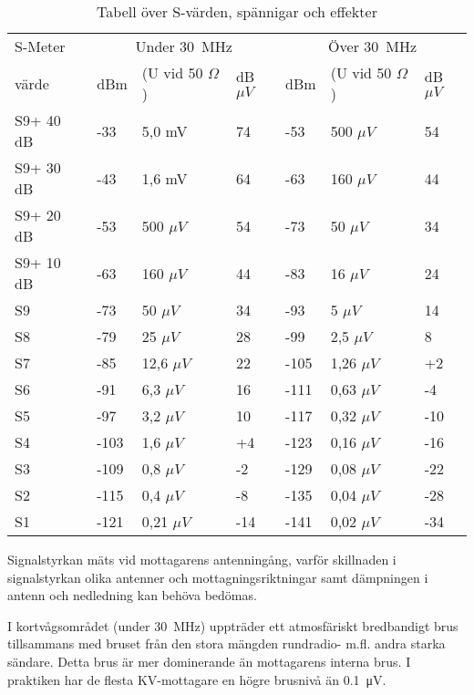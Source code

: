 \begin{table}[h!]
  \vspace{10ex}
	\centering
	\begin{tabular}{l|lll|lll}
    S-Meter  & \multicolumn{3}{c}{Under 30~MHz} & \multicolumn{3}{c}{Över 30~MHz} \\
    värde    & dBm & (U vid 50 \(\Omega\)) & dB\(\mu V\) & dBm & (U vid 50 \(\Omega\)) & dB\(\mu V\) \\
    \hline
    S9+ 40 dB & -33  & 5,0 mV  & 74  & -53  & 500 \(\mu V\) & 54  \\
    S9+ 30 dB & -43  & 1,6 mV  & 64  & -63  & 160 \(\mu V\) & 44  \\
    S9+ 20 dB & -53  & 500 \(\mu V\)  & 54  & -73  & 50 \(\mu V\) & 34  \\
    S9+ 10 dB & -63  & 160 \(\mu V\)  & 44  & -83  & 16 \(\mu V\) & 24  \\
    S9        & -73  & 50 \(\mu V\)   & 34  & -93  & 5 \(\mu V\) & 14  \\
    S8        & -79  & 25 \(\mu V\)   & 28  & -99  & 2,5 \(\mu V\) & 8   \\
    S7        & -85  & 12,6 \(\mu V\) & 22  & -105 & 1,26 \(\mu V\) & +2  \\
    S6        & -91  & 6,3 \(\mu V\)  & 16  & -111 & 0,63 \(\mu V\) & -4  \\
    S5        & -97  & 3,2 \(\mu V\)  & 10  & -117 & 0,32 \(\mu V\) & -10 \\
    S4        & -103 & 1,6 \(\mu V\)  & +4  & -123 & 0,16 \(\mu V\) & -16 \\
    S3        & -109 & 0,8 \(\mu V\)  & -2  & -129 & 0,08 \(\mu V\) & -22 \\
    S2        & -115 & 0,4 \(\mu V\)  & -8  & -135 & 0,04 \(\mu V\) & -28 \\
    S1        & -121 & 0,21 \(\mu V\) & -14 & -141 & 0,02 \(\mu V\) & -34 \\
  \end{tabular}
  \caption{Tabell över S-värden, spännigar och effekter}
\end{table}

\newpage

Signalstyrkan mäts vid mottagarens antenningång, varför skillnaden i
signalstyrkan olika antenner och mottagningsriktningar samt dämpningen
i antenn och nedledning kan behöva bedömas.

I kortvågsområdet (under \SI{30}{\mega\hertz}) uppträder ett atmosfäriskt
bredbandigt brus tillsammans med bruset från den stora mängden rundradio- m.fl.
andra starka sändare.
Detta brus är mer dominerande än mottagarens interna brus.
I praktiken har de flesta KV-mottagare en högre brusnivå än
\SI{0,1}{\micro\volt}.

